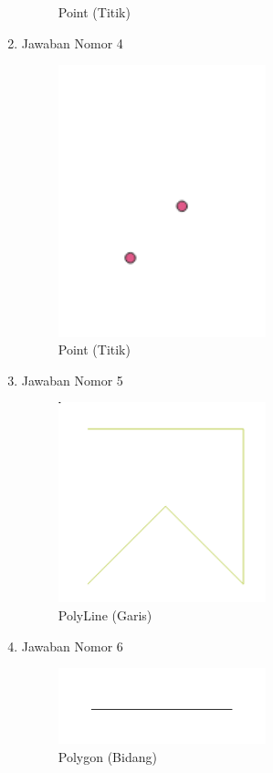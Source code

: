 \begin{enumerate}
\begin{figure}[H]
		\centering
		\caption{Point (Titik)}
	\end{figure}
	\item Jawaban Nomor 4
	
	\begin{figure}[H]
		\includegraphics[width=6cm]{figures/Tugas2/1174067/4.png}
		\centering
		\caption{Point (Titik)}
	\end{figure}
	\item Jawaban Nomor 5
	
	\begin{figure}[H]
		\includegraphics[width=6cm]{figures/Tugas2/1174067/5.png}
		\centering
		\caption{PolyLine (Garis)}
	\end{figure}
	\item Jawaban Nomor 6
	
	\begin{figure}[H]
		\includegraphics[width=6cm]{figures/Tugas2/1174067/6.png}
		\centering
		\caption{Polygon (Bidang)}
	\end{figure}

\end{enumerate}

